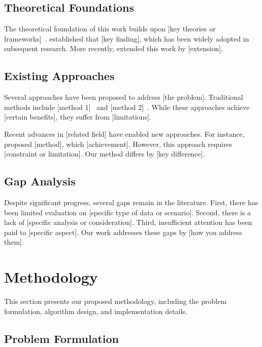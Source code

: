 \documentclass[12pt,a4paper]{article}
\theoremstyle{definition}
\theoremstyle{remark}
\begin{document}
\subsection{Theoretical Foundations}
\label{subsec:theoretical}

The theoretical foundation of this work builds upon [key theories or frameworks]~\cite{reference3}. \citet{reference4} established that [key finding], which has been widely adopted in subsequent research. More recently, \citet{reference5} extended this work by [extension].

\subsection{Existing Approaches}
\label{subsec:existing}

Several approaches have been proposed to address [the problem]. Traditional methods include [method 1]~\cite{reference6} and [method 2]~\cite{reference7}. While these approaches achieve [certain benefits], they suffer from [limitations].

Recent advances in [related field] have enabled new approaches. For instance, \citet{reference8} proposed [method], which [achievement]. However, this approach requires [constraint or limitation]. Our method differs by [key difference].

\subsection{Gap Analysis}
\label{subsec:gap}

Despite significant progress, several gaps remain in the literature. First, there has been limited evaluation on [specific type of data or scenario]. Second, there is a lack of [specific analysis or consideration]. Third, insufficient attention has been paid to [specific aspect]. Our work addresses these gaps by [how you address them].

\section{Methodology}
\label{sec:methodology}

This section presents our proposed methodology, including the problem formulation, algorithm design, and implementation details.

\subsection{Problem Formulation}
\label{subsec:problem}
\end{document}
